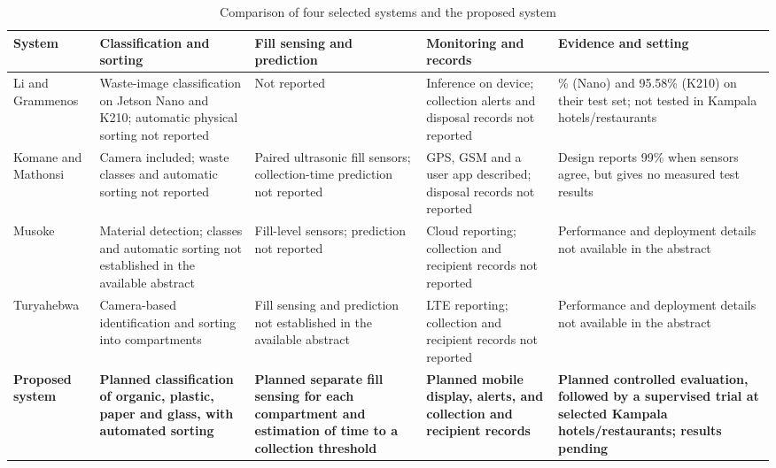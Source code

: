 \documentclass[12pt,a4paper]{report}
\begin{document}
\begin{table}[htbp]
\centering
\scriptsize
\renewcommand{\arraystretch}{1.2}
\setlength{\tabcolsep}{3pt}
\begin{tabular}{>{\raggedright\arraybackslash}p{2.25cm}>{\raggedright\arraybackslash}p{3.05cm}>{\raggedright\arraybackslash}p{3.05cm}>{\raggedright\arraybackslash}p{3.05cm}>{\raggedright\arraybackslash}p{3.4cm}}
\hline
\textbf{System} & \textbf{Classification and sorting} & \textbf{Fill sensing and prediction} & \textbf{Monitoring and records} & \textbf{Evidence and setting}\\
\hline
Li and Grammenos \cite{li} & Waste-image classification on Jetson Nano and K210; automatic physical sorting not reported & Not reported & Inference on device; collection alerts and disposal records not reported & 95.98\% (Nano) and 95.58\% (K210) on their test set; not tested in Kampala hotels/restaurants\\
Komane and Mathonsi \cite{komane} & Camera included; waste classes and automatic sorting not reported & Paired ultrasonic fill sensors; collection-time prediction not reported & GPS, GSM and a user app described; disposal records not reported & Design reports 99\% when sensors agree, but gives no measured test results\\
Musoke \cite{musoke} & Material detection; classes and automatic sorting not established in the available abstract & Fill-level sensors; prediction not reported & Cloud reporting; collection and recipient records not reported & Performance and deployment details not available in the abstract\\
Turyahebwa \cite{turyahebwa} & Camera-based identification and sorting into compartments & Fill sensing and prediction not established in the available abstract & LTE reporting; collection and recipient records not reported & Performance and deployment details not available in the abstract\\
\textbf{Proposed system} & \textbf{Planned classification of organic, plastic, paper and glass, with automated sorting} & \textbf{Planned separate fill sensing for each compartment and estimation of time to a collection threshold} & \textbf{Planned mobile display, alerts, and collection and recipient records} & \textbf{Planned controlled evaluation, followed by a supervised trial at selected Kampala hotels/restaurants; results pending}\\
\hline
\end{tabular}
\setlength{\tabcolsep}{6pt}
\caption{Comparison of four selected systems and the proposed system}
\label{tab:existing}
\end{table}
\clearpage
\end{document}
